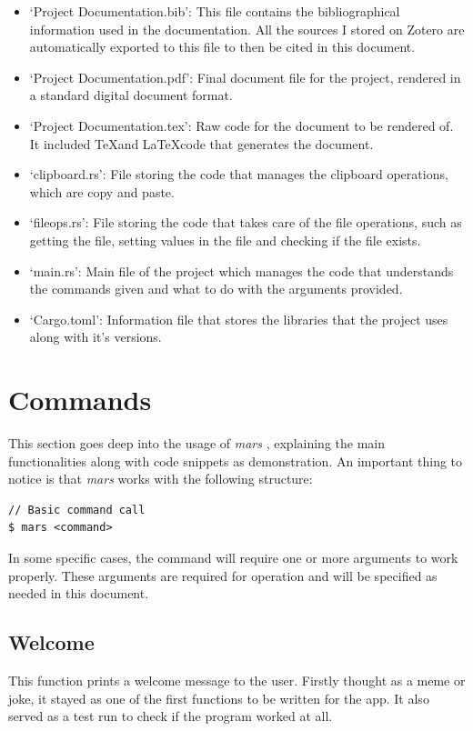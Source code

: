 \documentclass{report}
\begin{document}
\begin{itemize}
\item{`Project Documentation.bib'}: This file contains the bibliographical information used in the documentation. All the sources I stored on Zotero are automatically exported to this file to then be cited in this document.
\item{`Project Documentation.pdf'}: Final document file for the project, rendered in a standard digital document format.
\item{`Project Documentation.tex'}: Raw code for the document to be rendered of. It included \TeX \space and \LaTeX \space code that generates the document.
\item{`clipboard.rs'}: File storing the code that manages the clipboard operations, which are copy and paste.
\item{`fileops.rs'}: File storing the code that takes care of the file operations, such as getting the file, setting values in the file and checking if the file exists.
\item{`main.rs'}: Main file of the project which manages the code that understands the commands given and what to do with the arguments provided.
\item{`Cargo.toml'}: Information file that stores the libraries that the project uses along with it's versions.
\end{itemize}

\section{Commands}
This section goes deep into the usage of \emph{mars} \cite{fernandezMariolfhMars2025}, explaining the main functionalities along with code snippets as demonstration.
An important thing to notice is that \emph{mars} works with the following structure:
\begin{lstlisting}
// Basic command call
$ mars <command>
\end{lstlisting}
In some specific cases, the command will require one or more arguments to work properly. These arguments are required for operation and will be specified as needed in this document.

\subsection{Welcome}
This function prints a welcome message to the user. Firstly thought as a meme or joke, it stayed as one of the first functions to be written for the app. It also served as a test run to check if the program worked at all.
\end{document}
